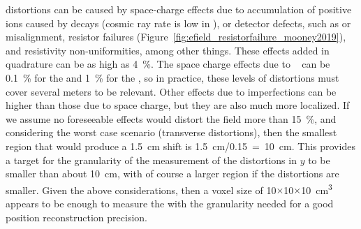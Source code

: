 \efield distortions can be caused by space-charge effects due to accumulation of positive ions caused by  decays (cosmic ray rate is low in ), or detector defects, such as  or  misalignment,  resistor failures (Figure~\ref{fig:efield_resistorfailure_mooney2019}), and resistivity non-uniformities, among other things.
These effects added in quadrature can be as high as \SI{4}{\%}. 
The space charge effects due to ~\cite{bib:mooney2018} can be \SI{0.1}{\%} for the  and \SI{1}{\%} for the , so in practice, these levels of 
distortions must cover several meters to be relevant.
Other effects due to  imperfections can be higher than those due to space charge, but they are also much more localized. If we assume no foreseeable effects would distort the field more than \SI{15}{\%}, and considering the worst case scenario (transverse distortions), then the smallest region that would produce a \SI{1.5}{\cm} shift is \SI{1.5}{\cm}/\num{0.15}~=~\SI{10}{\cm}. This provides a target for the granularity of the measurement of the \efield distortions in $y$ to be smaller than about \SI{10}{\cm}, with of course a larger region if the distortions are smaller. Given the above considerations, then a voxel size of \num{10}$\times$\num{10}$\times$\SI{10}{\cubic\cm} appears to be enough to measure the \efield with the granularity needed for a good position reconstruction precision. 



\begin{comment}
\begin{dunetable}
[Calibration Requirements]
{p{0.5\textwidth}p{0.15\textwidth}p{0.15\textwidth}}
{tab:calibreq}
{Calibration Specifications and Goals}   
Requirement & Specification & Goal \\ \toprowrule
\efield measurement precision & < 1\% & ALARA \\ \colhline
\efield measurement coverage & > 93\% & AHARA \\ \colhline
\efield measurement granularity & < 10x10x10 cm & ALARA \\ \colhline
\end{dunetable}
\end{comment}

